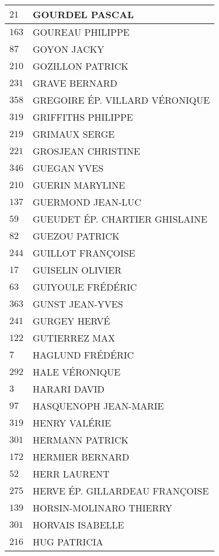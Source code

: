 \begin{xltabular}{\linewidth}{|l|X|}
    \hline
    $21$ & GOURDEL PASCAL \\
    \hline
    $163$ & GOUREAU PHILIPPE \\
    \hline
    $87$ & GOYON JACKY \\
    \hline
    $210$ & GOZILLON PATRICK \\
    \hline
    $231$ & GRAVE BERNARD \\
    \hline
    $358$ & GREGOIRE ÉP. VILLARD VÉRONIQUE \\
    \hline
    $319$ & GRIFFITHS PHILIPPE \\
    \hline
    $219$ & GRIMAUX SERGE \\
    \hline
    $221$ & GROSJEAN CHRISTINE \\
    \hline
    $346$ & GUEGAN YVES \\
    \hline
    $210$ & GUERIN MARYLINE \\
    \hline
    $137$ & GUERMOND JEAN-LUC \\
    \hline
    $59$ & GUEUDET ÉP. CHARTIER GHISLAINE \\
    \hline
    $82$ & GUEZOU PATRICK \\
    \hline
    $244$ & GUILLOT FRANÇOISE \\
    \hline
    $17$ & GUISELIN OLIVIER \\
    \hline
    $63$ & GUIYOULE FRÉDÉRIC \\
    \hline
    $363$ & GUNST JEAN-YVES \\
    \hline
    $241$ & GURGEY HERVÉ \\
    \hline
    $122$ & GUTIERREZ MAX \\
    \hline
    $7$ & HAGLUND FRÉDÉRIC \\
    \hline
    $292$ & HALE VÉRONIQUE \\
    \hline
    $3$ & HARARI DAVID \\
    \hline
    $97$ & HASQUENOPH JEAN-MARIE \\
    \hline
    $319$ & HENRY VALÉRIE \\
    \hline
    $301$ & HERMANN PATRICK \\
    \hline
    $172$ & HERMIER BERNARD \\
    \hline
    $52$ & HERR LAURENT \\
    \hline
    $275$ & HERVE ÉP. GILLARDEAU FRANÇOISE \\
    \hline
    $139$ & HORSIN-MOLINARO THIERRY \\
    \hline
    $301$ & HORVAIS ISABELLE \\
    \hline
    $216$ & HUG PATRICIA \\

\end{xltabular}
